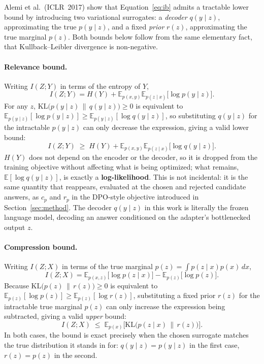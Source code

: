 \documentclass[11pt,a4paper,oneside]{article}
\begin{document}
Alemi et al.\ (ICLR~2017) show that Equation~\eqref{eq:ib} admits a tractable lower bound by
introducing two variational surrogates: a \emph{decoder} $q(y\mid z)$, approximating the true
$p(y\mid z)$, and a fixed \emph{prior} $r(z)$, approximating the true marginal $p(z)$. Both bounds
below follow from the same elementary fact, that Kullback--Leibler divergence is non-negative.

\paragraph{Relevance bound.} Writing $I(Z;Y)$ in terms of the entropy of $Y$,
\[
I(Z;Y) = H(Y) + \mathbb E_{p(x,y)}\mathbb E_{p(z\mid x)}\big[\log p(y\mid z)\big].
\]
For any $z$, $\mathrm{KL}\big(p(y\mid z)\,\|\,q(y\mid z)\big)\ge0$ is equivalent to
$\mathbb E_{p(y\mid z)}[\log p(y\mid z)] \ge \mathbb E_{p(y\mid z)}[\log q(y\mid z)]$, so substituting
$q(y\mid z)$ for the intractable $p(y\mid z)$ can only decrease the expression, giving a valid lower
bound:
\begin{equation}
I(Z;Y) \;\ge\; H(Y) + \mathbb E_{p(x,y)}\mathbb E_{p(z\mid x)}\big[\log q(y\mid z)\big].
\label{eq:relevance-bound}
\end{equation}
$H(Y)$ does not depend on the encoder or the decoder, so it is dropped from the training objective
without affecting what is being optimized; what remains, $\mathbb E[\log q(y\mid z)]$, is exactly a
\textbf{log-likelihood}. This is not incidental: it is the same quantity that reappears, evaluated at
the chosen and rejected candidate answers, as $c_p$ and $r_p$ in the DPO-style objective introduced in
Section~\ref{sec:method}. The decoder $q(y\mid z)$ in this work is literally the frozen language
model, decoding an answer conditioned on the adapter's bottlenecked output $z$.

\paragraph{Compression bound.} Writing $I(Z;X)$ in terms of the true marginal $p(z)=\int p(z\mid
x)p(x)\,dx$,
\[
I(Z;X) = \mathbb E_{p(x,z)}\big[\log p(z\mid x)\big] - \mathbb E_{p(z)}\big[\log p(z)\big].
\]
Because $\mathrm{KL}\big(p(z)\,\|\,r(z)\big)\ge0$ is equivalent to $\mathbb E_{p(z)}[\log p(z)] \ge
\mathbb E_{p(z)}[\log r(z)]$, substituting a fixed prior $r(z)$ for the intractable true marginal
$p(z)$ can only increase the expression being subtracted, giving a valid \emph{upper} bound:
\begin{equation}
I(Z;X) \;\le\; \mathbb E_{p(x)}\big[\mathrm{KL}\big(p(z\mid x)\,\|\,r(z)\big)\big].
\label{eq:compression-bound}
\end{equation}
In both cases, the bound is exact precisely when the chosen surrogate matches the true distribution
it stands in for: $q(y\mid z)=p(y\mid z)$ in the first case, $r(z)=p(z)$ in the second.
\end{document}

